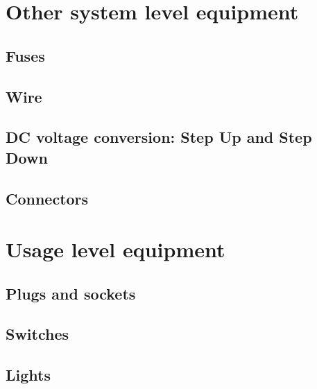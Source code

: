 \documentclass[letterpaper,10pt,english]{sphinxmanual}
\begin{document}
\chapter{Other system level equipment}
\label{\detokenize{other_system_level_equipment:other-system-level-equipment}}\label{\detokenize{other_system_level_equipment::doc}}

\section{Fuses}
\label{\detokenize{other_system_level_equipment:fuses}}

\section{Wire}
\label{\detokenize{other_system_level_equipment:wire}}

\section{DC voltage conversion: Step Up and Step Down}
\label{\detokenize{other_system_level_equipment:dc-voltage-conversion-step-up-and-step-down}}

\section{Connectors}
\label{\detokenize{other_system_level_equipment:connectors}}

\chapter{Usage level equipment}
\label{\detokenize{usage_level_equipment:usage-level-equipment}}\label{\detokenize{usage_level_equipment::doc}}

\section{Plugs and sockets}
\label{\detokenize{usage_level_equipment:plugs-and-sockets}}

\section{Switches}
\label{\detokenize{usage_level_equipment:switches}}

\section{Lights}
\label{\detokenize{usage_level_equipment:lights}}
\end{document}
